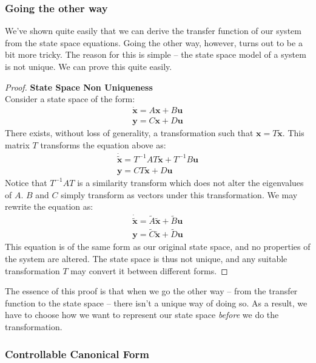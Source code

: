 \subsubsection{Going the other way}
We've shown quite easily that we can derive the transfer function of our system from the state space equations. Going the other way, however, turns out to be a bit more tricky. The reason for this is simple -- the state space model of a system is not unique. We can prove this quite easily.
\begin{proof}\textbf{State Space Non Uniqueness}
\\Consider a state space of the form:
\begin{gather}
    \bm{\dot{x}}=A\bm{x}+B\bm{u}\\
    \bm{y}=C\bm{x}+D\bm{u}
\end{gather}
There exists, without loss of generality, a transformation such that $\bm{{x}}=T\bm{\tilde{x}}$. This matrix $T$ transforms the equation above as:
\begin{gather}
    \bm{\dot{\tilde{x}}}=T^{-1}AT\bm{\tilde{x}}+T^{-1}B\bm{u}\\
    \bm{y}=CT\bm{\tilde{x}}+D\bm{u}
\end{gather}
Notice that $T^{-1}AT$ is a similarity transform which does not alter the eigenvalues of $A$. $B$ and $C$ simply transform as vectors under this transformation. We may rewrite the equation as:
\begin{gather}
    \bm{\dot{\tilde{x}}}=\tilde{A}\bm{\tilde{x}}+\tilde{B}\bm{u}\\
    \bm{y}=\tilde{C}\bm{\tilde{x}}+\tilde{D}\bm{u}
\end{gather}
This equation is of the same form as our original state space, and no properties of the system are altered. The state space is thus not unique, and any suitable transformation $T$ may convert it between different forms.
\end{proof}
The essence of this proof is that when we go the other way -- from the transfer function to the state space -- there isn't a unique way of doing so. As a result, we have to choose how we want to represent our state space \textit{before} we do the transformation.

\subsubsection{Controllable Canonical Form}


